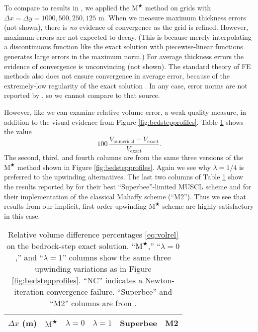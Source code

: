 \documentclass[review,letterpaper]{igs}
\newcommand{\Mstar}{$\text{M}^{\bigstar}$\xspace}
\begin{document}
To compare to results in \citep{JaroschSchoofAnslow2013}, we applied the \Mstar method on grids with $\Delta x=\Delta y = 1000,500,250,125$ m.  When we measure maximum thickness errors (not shown), there is \emph{no} evidence of convergence as the grid is refined.  However, maximum errors are not expected to decay.  (This is because merely interpolating a discontinuous function like the exact solution with piecewise-linear functions generates large errors in the maximum norm.)  For average thickness errors the evidence of convergence is unconvincing (not shown).  The standard theory of FE methods also does not ensure convergence in average error, because of the extremely-low regularity of the exact solution \citep{Elmanetal2005}.  In any case, error norms are not reported by \cite{JaroschSchoofAnslow2013}, so we cannot compare to that source.

However, like \cite{JaroschSchoofAnslow2013} we can examine relative volume error, a weak quality measure, in addition to the visual evidence from Figure \ref{fig:bedstepprofiles}.  Table \ref{tab:bedstepvol} shows the value
\begin{equation}
100\, \frac{V_{\text{numerical}} - V_{\text{exact}}}{V_{\text{exact}}}. \label{eq:volrel}
\end{equation}
The second, third, and fourth columns are from the same three versions of the \Mstar method shown in Figure \ref{fig:bedstepprofiles}.  Again we see why $\lambda=1/4$ is preferred to the upwinding alternatives.  The last two columns of Table \ref{tab:bedstepvol} show the results reported by \cite{JaroschSchoofAnslow2013} for their best ``Superbee''-limited MUSCL scheme and for their implementation of the classical Mahaffy scheme (``M2'').  Thus we see that results from our implicit, first-order-upwinding \Mstar scheme are highly-satisfactory in this case.

\begin{table}[ht]
  \caption{Relative volume difference percentages \eqref{eq:volrel} on the bedrock-step exact solution.  ``\Mstar,'' ``$\lambda=0$,'' and ``$\lambda=1$'' columns show the same three upwinding variations as in Figure \ref{fig:bedstepprofiles}.  ``NC'' indicates a Newton-iteration convergence failure.  ``Superbee'' and ``M2'' columns are from \cite{JaroschSchoofAnslow2013}.}
  \vskip4mm \centering
  \begin{tabular}{lccccc}
    $\Delta x$ (m) & \Mstar & $\lambda=0$ & $\lambda=1$ & Superbee & M2 \\  \hline

  \end{tabular}
  \label{tab:bedstepvol}
\end{table}
\end{document}
